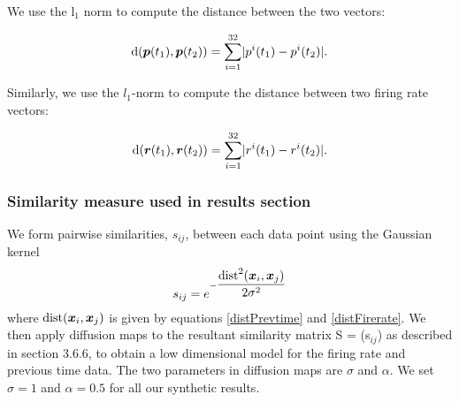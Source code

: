 We use the l$_{1}$ norm to compute the distance between the two vectors:

\begin{equation}\label{distPrevtime}
\text{d}(\boldsymbol{p}(t_{1}), \boldsymbol{p}(t_{2}) ) = 
\displaystyle \sum_{i=1}^{32} \lvert p^{i}(t_{1}) - p^{i}(t_{2})   \rvert.
\end{equation}

Similarly, we use the $l_{1}$-norm to compute the distance between two firing rate vectors:

\begin{equation}\label{distFirerate}
\text{d}(\boldsymbol{r}(t_{1}), \boldsymbol{r}(t_{2}) ) = 
\displaystyle \sum_{i=1}^{32} \lvert r^{i}(t_{1}) - r^{i}(t_{2})   \rvert.
\end{equation}


\subsubsection{Similarity measure used in results section}
We form pairwise similarities, $s_{ij}$, between each data point
using the Gaussian kernel 
\[
s_{ij} = e^{-\dfrac{\text{dist}^{2}(\boldsymbol{x}_{i}, \boldsymbol{x}_{j})}{2\sigma^2}} 
\]
where $\text{dist}(\boldsymbol{x}_{i}, \boldsymbol{x}_{j})$ is given by equations
\eqref{distPrevtime} and \eqref{distFirerate}.
We then apply diffusion maps to the resultant similarity matrix S = (s$_{ij}$) 
as described in section 3.6.6, to obtain a low dimensional model for the 
firing rate and previous time data.
The two parameters in diffusion maps are $\sigma$ and $\alpha$.
We set $\sigma =1$ and $\alpha = 0.5$ for all our synthetic results.

























